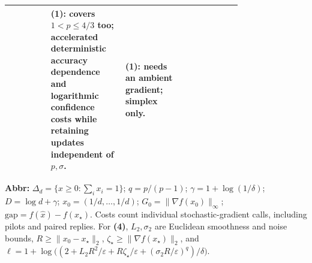 \begin{table}[tp]
\begin{threeparttable}
\begin{tabularx}{\linewidth}{@{}>{\raggedright\arraybackslash}p{0.18\linewidth}>{\raggedright\arraybackslash}p{0.32\linewidth}>{\raggedright\arraybackslash}p{0.27\linewidth}>{\raggedright\arraybackslash}X@{}}
& \textbf{(1)}: covers $1<p\le4/3$ too; accelerated deterministic accuracy dependence and logarithmic confidence costs while retaining updates independent of $p,\sigma$.
& \textbf{(1)}: needs an ambient gradient; simplex only. \\
\bottomrule
\end{tabularx}
\begin{tablenotes}[flushleft]\footnotesize
\item[] \textbf{Abbr:} $\Delta_d=\{x\ge0:\sum_i x_i=1\}$; $q=p/(p-1)$; $\gamma=1+\log(1/\delta)$; $D=\log d+\gamma$; $x_0=(1/d,\ldots,1/d)$; $G_0=\|\nabla f(x_0)\|_\infty$; $\mathrm{gap}=f(\widehat x)-f(x_\star)$. Costs count individual stochastic-gradient calls, including pilots and paired replies. For \textbf{(4)}, $L_2,\sigma_2$ are Euclidean smoothness and noise bounds, $R\ge\|x_0-x_\star\|_2$, $\zeta_\star\ge\|\nabla f(x_\star)\|_2$, and $\ell=1+\log\!\bigl((2+L_2R^2/\varepsilon+R\zeta_\star/\varepsilon+(\sigma_2R/\varepsilon)^q)/\delta\bigr)$.
\end{tablenotes}
\end{threeparttable}
\end{table}
\clearpage
